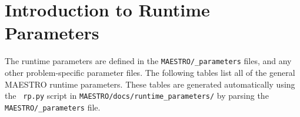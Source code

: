 
\section{Introduction to Runtime Parameters}
\label{sec:runtime_parameters}

The runtime parameters are defined in the {\tt MAESTRO/\_parameters}
files, and any other problem-specific parameter files.
The following tables list all of the general MAESTRO runtime
parameters.  These tables are generated automatically using the {\tt
  rp.py} script in {\tt MAESTRO/docs/runtime\_parameters/} by parsing
the {\tt MAESTRO/\_parameters} file.
